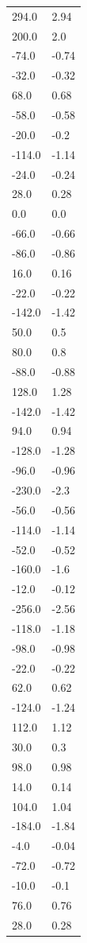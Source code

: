 \begin{longtable}{ll}
294.0 & 2.94 \\
200.0 & 2.0 \\
-74.0 & -0.74 \\
-32.0 & -0.32 \\
68.0 & 0.68 \\
-58.0 & -0.58 \\
-20.0 & -0.2 \\
-114.0 & -1.14 \\
-24.0 & -0.24 \\
28.0 & 0.28 \\
0.0 & 0.0 \\
-66.0 & -0.66 \\
-86.0 & -0.86 \\
16.0 & 0.16 \\
-22.0 & -0.22 \\
-142.0 & -1.42 \\
50.0 & 0.5 \\
80.0 & 0.8 \\
-88.0 & -0.88 \\
128.0 & 1.28 \\
-142.0 & -1.42 \\
94.0 & 0.94 \\
-128.0 & -1.28 \\
-96.0 & -0.96 \\
-230.0 & -2.3 \\
-56.0 & -0.56 \\
-114.0 & -1.14 \\
-52.0 & -0.52 \\
-160.0 & -1.6 \\
-12.0 & -0.12 \\
-256.0 & -2.56 \\
-118.0 & -1.18 \\
-98.0 & -0.98 \\
-22.0 & -0.22 \\
62.0 & 0.62 \\
-124.0 & -1.24 \\
112.0 & 1.12 \\
30.0 & 0.3 \\
98.0 & 0.98 \\
14.0 & 0.14 \\
104.0 & 1.04 \\
-184.0 & -1.84 \\
-4.0 & -0.04 \\
-72.0 & -0.72 \\
-10.0 & -0.1 \\
76.0 & 0.76 \\
28.0 & 0.28 \\

\end{longtable}
